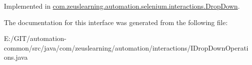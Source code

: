 Implemented in \hyperlink{classcom_1_1zeuslearning_1_1automation_1_1selenium_1_1interactions_1_1DropDown_a192726c41689be2fd5ee44ad49262950}{com.\+zeuslearning.\+automation.\+selenium.\+interactions.\+Drop\+Down}.



The documentation for this interface was generated from the following file\+:\begin{DoxyCompactItemize}
\item 
E\+:/\+G\+I\+T/automation-\/common/src/java/com/zeuslearning/automation/interactions/I\+Drop\+Down\+Operations.\+java\end{DoxyCompactItemize}
